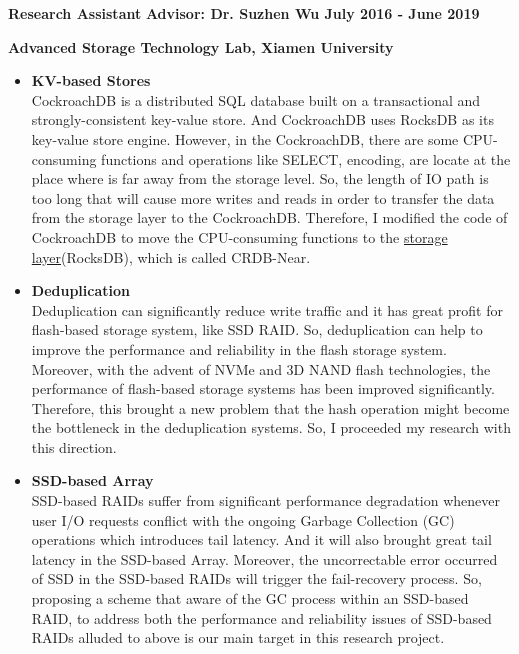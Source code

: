 \documentclass[letterpaper,onecolumn,10pt]{article}
\begin{document}
\raggedright
{\bf Research Assistant }
\hfill
{\bf Advisor: Dr. Suzhen Wu \hspace{0.3cm} July 2016 - June 2019}\\
\raggedright
{\bf Advanced Storage Technology Lab, Xiamen University}
\begin{itemize}
\item \textbf{KV-based Stores} \\
CockroachDB is a distributed SQL database built on a transactional and strongly-consistent key-value store. And CockroachDB uses RocksDB as its key-value store engine. However, in the CockroachDB,  there are some CPU-consuming functions and operations like SELECT, encoding, are locate at the place where is far away from the storage level. So, the length of IO path is too long that will cause more writes and reads in order to transfer the data from the storage layer to the CockroachDB. Therefore, I modified the code of CockroachDB to move the CPU-consuming functions to the \underline {storage layer}(RocksDB), which is called CRDB-Near.
\end{itemize}
\begin{itemize}
\item \textbf{Deduplication} \\
Deduplication can significantly reduce write traffic and it has great profit for flash-based storage system, like SSD RAID. So, deduplication can help to improve the performance and reliability in the flash storage system. Moreover, with the advent of NVMe and 3D NAND flash technologies, the performance of flash-based storage systems has been improved significantly. Therefore, this brought a new problem that the hash operation might become the bottleneck in the deduplication systems. So, I proceeded my research with this direction.
\end{itemize}
\begin{itemize}
\item \textbf{SSD-based Array} \\
SSD-based RAIDs suffer from significant performance degradation whenever user I/O requests conflict with the ongoing Garbage Collection (GC) operations which introduces tail latency. And it will also brought great tail latency in the SSD-based Array. Moreover, the uncorrectable error occurred of SSD in the SSD-based RAIDs will trigger the fail-recovery process. So, proposing a scheme that aware of the GC process within an SSD-based RAID, to address both the performance and reliability issues of SSD-based RAIDs alluded to above is our main target in this research project.
\end{itemize}
\end{document}
